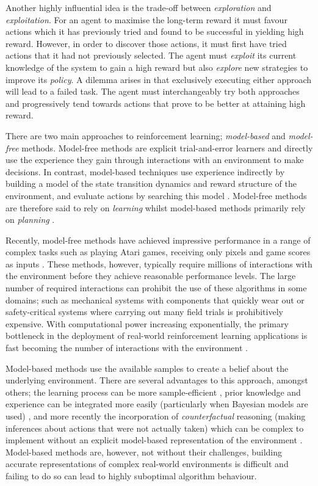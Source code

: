 Another highly influential idea is the trade-off between \textit{exploration} and \textit{exploitation}. For an agent to maximise the long-term reward it must favour actions which it has previously tried and found to be successful in yielding high reward. However, in order to discover those actions, it must first have tried actions that it had not previously selected. The agent must \textit{exploit} its current knowledge of the system to gain a high reward but also \textit{explore} new strategies to improve its \textit{policy}. A dilemma arises in that exclusively executing either approach will lead to a failed task. The agent must interchangeably try both approaches and progressively tend towards actions that prove to be better at attaining high reward.

There are two main approaches to reinforcement learning; \textit{model-based} and \textit{model-free} methods. Model-free methods are explicit trial-and-error learners and directly use the experience they gain through interactions with an environment to make decisions. In contrast, model-based techniques use experience indirectly by building a model of the state transition dynamics and reward structure of the environment, and evaluate actions by searching this model \citep{glascher2010states}. Model-free methods are therefore said to rely on \textit{learning} whilst model-based methods primarily  rely on \textit{planning} \citep{sutton2018reinforcement}. 

Recently, model-free methods have achieved impressive performance in a range of complex tasks such as playing Atari games, receiving only pixels and game scores as inputs \citep{mnih2015human}. These methods, however, typically require millions of interactions with the environment before they achieve reasonable performance levels. The large number of required interactions can prohibit the use of these algorithms in some domains; such as mechanical systems with components that quickly wear out \citep{deisenroth2011pilco} or safety-critical systems where carrying out many field trials is prohibitively expensive. With computational power increasing exponentially, the primary bottleneck in the deployment of real-world reinforcement learning applications is fast becoming the number of interactions with the environment \citep{Wan2018ModelbasedRL}.

Model-based methods use the available samples to create a belief about the underlying environment. There are several advantages to this approach, amongst others; the learning process can be more sample-efficient \citep{deisenroth2013gaussian}, prior knowledge and experience can be integrated more easily (particularly when Bayesian models are used) \citep{lopes2012exploration}, and more recently the incorporation of \textit{counterfactual} reasoning (making inferences about actions that were not actually taken) which can be complex to implement without an explicit model-based representation of the environment \citep{buesing2018woulda}. Model-based methods are, however, not without their challenges, building accurate representations of complex real-world environments is difficult and failing to do so can lead to highly suboptimal algorithm behaviour.


